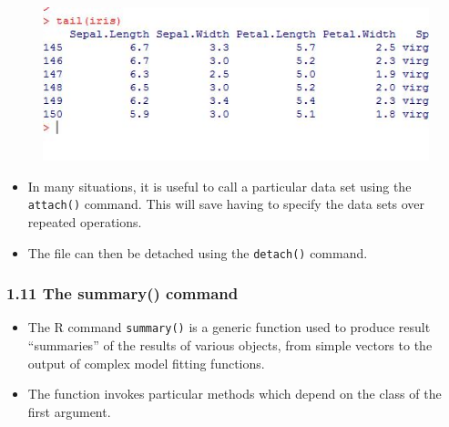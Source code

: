 \documentclass{beamer}
\begin{document}
 	\begin{frame}
 		\begin{figure}
 			\centering
 			\includegraphics[width=1.2\linewidth]{images/iristail}     
 		\end{figure}
 	\end{frame}   
 	\begin{frame}
 		\begin{itemize}
 			\item In many situations, it is useful to call a particular data set using the \texttt{attach()} command. This
 			will save having to specify the data sets over repeated operations. 
 			\item The file can then be detached
 			using the \texttt{detach()} command.
 		\end{itemize}
 		
 		
 		
 	\end{frame}
 	\begin{frame}
 		\frametitle{1.11 The summary() command}
 		
 		\begin{itemize}
 		\item The R command \texttt{summary()} is a generic function used to produce result “summaries” of the
 		results of various objects, from simple vectors to the output of complex model fitting functions.
 		\item The function invokes particular methods which depend on the class of the first argument.
 		\end{itemize}
 	\end{frame}
\end{document}
